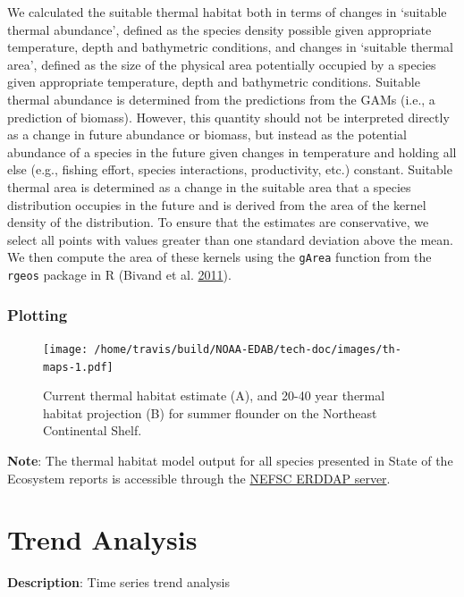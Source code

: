 \documentclass[
]{book}
\begin{document}
We calculated the suitable thermal habitat both in terms of changes in `suitable thermal abundance', defined as the species density possible given appropriate temperature, depth and bathymetric conditions, and changes in `suitable thermal area', defined as the size of the physical area potentially occupied by a species given appropriate temperature, depth and bathymetric conditions. Suitable thermal abundance is determined from the predictions from the GAMs (i.e., a prediction of biomass). However, this quantity should not be interpreted directly as a change in future abundance or biomass, but instead as the potential abundance of a species in the future given changes in temperature and holding all else (e.g., fishing effort, species interactions, productivity, etc.) constant. Suitable thermal area is determined as a change in the suitable area that a species distribution occupies in the future and is derived from the area of the kernel density of the distribution. To ensure that the estimates are conservative, we select all points with values greater than one standard deviation above the mean. We then compute the area of these kernels using the \texttt{gArea} function from the \texttt{rgeos} package in R (Bivand et al. \protect\hyperlink{ref-Bivand2011}{2011}).

\hypertarget{plotting-35}{%
\subsection{Plotting}\label{plotting-35}}

\begin{figure}
\centering
\texttt{[image: /home/travis/build/NOAA-EDAB/tech-doc/images/th-maps-1.pdf]}
\caption{\label{fig:th-maps}Current thermal habitat estimate (A), and 20-40 year thermal habitat projection (B) for summer flounder on the Northeast Continental Shelf.}
\end{figure}

\textbf{Note}: The thermal habitat model output for all species presented in State of the Ecosystem reports is accessible through the \href{https://comet.nefsc.noaa.gov/erddap/info/index.html?page=1\&itemsPerPage=1000}{NEFSC ERDDAP server}.

\hypertarget{trend-analysis}{%
\chapter{Trend Analysis}\label{trend-analysis}}

\textbf{Description}: Time series trend analysis
\end{document}
